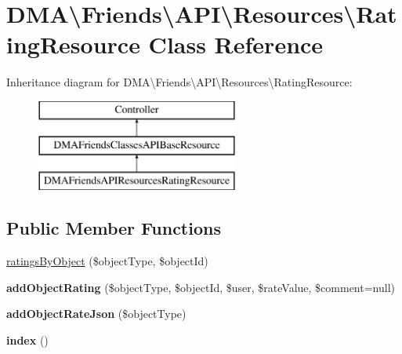 \hypertarget{classDMA_1_1Friends_1_1API_1_1Resources_1_1RatingResource}{}\section{D\+M\+A\textbackslash{}Friends\textbackslash{}A\+P\+I\textbackslash{}Resources\textbackslash{}Rating\+Resource Class Reference}
\label{classDMA_1_1Friends_1_1API_1_1Resources_1_1RatingResource}
Inheritance diagram for D\+M\+A\textbackslash{}Friends\textbackslash{}A\+P\+I\textbackslash{}Resources\textbackslash{}Rating\+Resource\+:\begin{figure}[H]
\begin{center}
\leavevmode
\includegraphics[height=3.000000cm]{d7/de0/classDMA_1_1Friends_1_1API_1_1Resources_1_1RatingResource}
\end{center}
\end{figure}
\subsection*{Public Member Functions}
\begin{DoxyCompactItemize}
\item 
\hyperlink{classDMA_1_1Friends_1_1API_1_1Resources_1_1RatingResource_a6cb4a4bb619ebf9cf82fda96892de587}{ratings\+By\+Object} (\$object\+Type, \$object\+Id)
\item 
\hypertarget{classDMA_1_1Friends_1_1API_1_1Resources_1_1RatingResource_a5a3342dbcaa4eda48599922fca2dca97}{}{\bfseries add\+Object\+Rating} (\$object\+Type, \$object\+Id, \$user, \$rate\+Value, \$comment=null)\label{classDMA_1_1Friends_1_1API_1_1Resources_1_1RatingResource_a5a3342dbcaa4eda48599922fca2dca97}

\item 
\hypertarget{classDMA_1_1Friends_1_1API_1_1Resources_1_1RatingResource_a5f73df541d7ca7a1fa30b30278e38b67}{}{\bfseries add\+Object\+Rate\+Json} (\$object\+Type)\label{classDMA_1_1Friends_1_1API_1_1Resources_1_1RatingResource_a5f73df541d7ca7a1fa30b30278e38b67}

\item 
\hypertarget{classDMA_1_1Friends_1_1API_1_1Resources_1_1RatingResource_a4a39636d2b996936fddfeeb7329ab143}{}{\bfseries index} ()\label{classDMA_1_1Friends_1_1API_1_1Resources_1_1RatingResource_a4a39636d2b996936fddfeeb7329ab143}

\end{DoxyCompactItemize}
